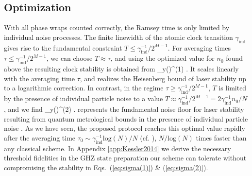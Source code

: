 \subsection{Optimization}
With all phase wraps counted correctly, the Ramsey time is only limited by
individual noise processes. The finite linewidth of the atomic clock transition
$\gamma_\mathrm{ind}$ gives rise to the fundamental constraint
$T\leq\gamma_\mathrm{ind}^{-1}/2^{M-1}$.
For averaging times
$\tau\leq\gamma_\mathrm{ind}^{-1}/2^{M-1}$, we can choose $T \approx \tau$, and
using the optimized value for $n_0$ found above the resulting clock stability is
obtained from 
\bel
	\label{eq:sigma(1)}
	\sigma_y(\tau)^{(1)} \approx	
	 \approx	{}
	.
\eel
It scales linearly with the averaging time $\tau$, and realizes the Heisenberg
bound of laser stability up to a logarithmic correction. In contrast, in the regime $\tau\geq\gamma_\mathrm{ind}^{-1}/2^{M-1}$, $T$ is limited
by the presence of individual particle noise to a value $T\approx \gamma_\mathrm{ind}^{-1}/2^{M-1}= 2 \gamma_\mathrm{ind}^{-1}n_0/N$, and we find
\bel
	\label{eq:sigma(2)}
	\sigma_y(\tau)^{(2)} \approx
	  .
\eel
{} represents the fundamental noise floor for laser stability
resulting from quantum metrological bounds in the presence of individual
particle noise \cite{Escher:2011fn}. As we have seen, the proposed protocol
reaches this optimal value rapidly after the averaging time $\tau_0 \sim  
\gamma_\mathrm{ind}^{-1} \mathrm{log}(N)/N$ (cf. ),
$N/\mathrm{log}(N)$ times faster than any classical scheme.
In Appendix \ref{app:Kessler2014} we derive the necessary threshold fidelities in
the GHZ state preparation our scheme can tolerate without compromising the stability
in Eqs.~(\ref{eq:sigma(1)}) \& (\ref{eq:sigma(2)}).

